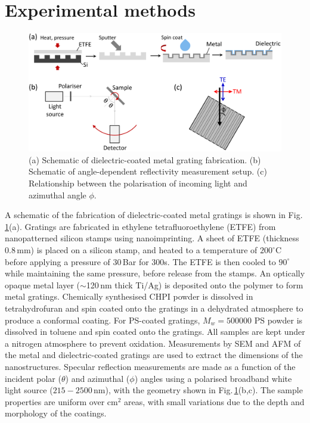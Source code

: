 \section{Experimental methods}
\begin{figure}[ht] 
\centering    
\includegraphics[width=\textwidth]{Fig1}
\caption{(a) Schematic of dielectric-coated metal grating fabrication. (b) Schematic of angle-dependent reflectivity measurement setup. (c) Relationship between the polarisation of incoming light and azimuthal angle $\phi$.}
\label{7Fig1}
\end{figure}
A schematic of the fabrication of dielectric-coated metal gratings is shown in Fig.\,\ref{7Fig1}(a). Gratings are fabricated in ethylene tetrafluoroethylene (ETFE) from nanopatterned silicon stamps using nanoimprinting. A sheet of ETFE (thickness 0.8\,mm) is placed on a silicon stamp, and heated to a temperature of $200^{\circ}$C before applying a pressure of 30\,Bar for 300s. The ETFE is then cooled to $90^{\circ}$ while maintaining the same pressure, before release from the stamps. An optically opaque metal layer ($\sim$120\,nm thick Ti/Ag) is deposited onto the polymer to form metal gratings. Chemically synthesised CHPI powder is dissolved in tetrahydrofuran and spin coated onto the gratings in a dehydrated atmosphere to produce a conformal coating. For PS-coated gratings, $M_w=500000$ PS powder is dissolved in toluene and spin coated onto the gratings. All samples are kept under a nitrogen atmosphere to prevent oxidation. Measurements by SEM and AFM of the metal and dielectric-coated gratings are used to extract the dimensions of the nanostructures. Specular reflection measurements are made as a function of the incident polar ($\theta$) and azimuthal ($\phi$) angles using a polarised broadband white light source ($215-2500$\,nm), with the geometry shown in Fig.\,\ref{7Fig1}(b,c). The sample properties are uniform over cm$^2$ areas, with small variations due to the depth and morphology of the coatings.

